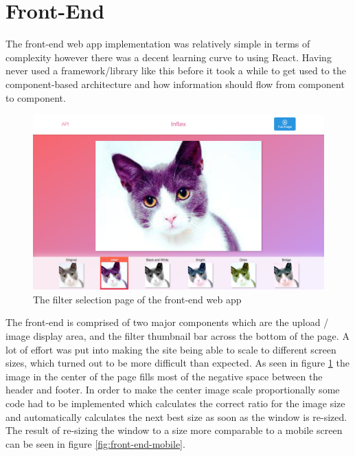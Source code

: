 \documentclass[a4paper,12pt]{report}
\begin{document}
  \section{Front-End}
    The front-end web app implementation was relatively simple in terms of complexity however there was a decent learning curve to using React. Having never used a framework/library like this before it took a while to get used to the component-based architecture and how information should flow from component to component.

    \begin{figure}[h]
      \centering
      \includegraphics[width=0.7\linewidth]{front-end-main}
      \caption{The filter selection page of the front-end web app}
      \label{fig:front-end-main}
    \end{figure}

    The front-end is comprised of two major components which are the upload / image display area, and the filter thumbnail bar across the bottom of the page. A lot of effort was put into making the site being able to scale to different screen sizes, which turned out to be more difficult than expected. As seen in figure \ref{fig:front-end-main} the image in the center of the page fills most of the negative space between the header and footer. In order to make the center image scale proportionally some code had to be implemented which calculates the correct ratio for the image size and automatically calculates the next best size as soon as the window is re-sized. The result of re-sizing the window to a size more comparable to a mobile screen can be seen in figure \ref{fig:front-end-mobile}.
\end{document}
